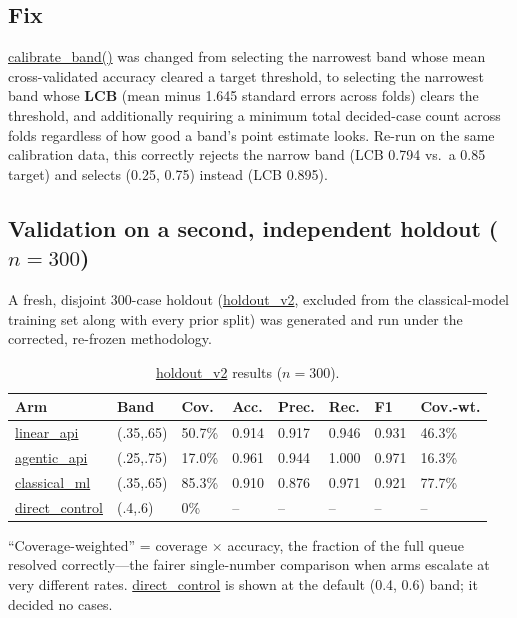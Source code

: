 \documentclass[]{ieeeaccess}
\newcommand{\code}[1]{\url{#1}}
\begin{document}
\subsection{Fix}\label{sec:fix}

\code{calibrate_band()} was changed from selecting the narrowest band
whose mean cross-validated accuracy cleared a target threshold, to
selecting the narrowest band whose \textbf{LCB} (mean minus 1.645
standard errors across folds) clears the threshold, and
additionally requiring a minimum total decided-case count across folds
regardless of how good a band's point estimate looks. Re-run on the same
calibration data, this correctly rejects the narrow band (LCB 0.794 vs.\
a 0.85 target) and selects (0.25, 0.75) instead (LCB 0.895).

\subsection{Validation on a second, independent holdout (\texorpdfstring{$n=300$}{n=300})}\label{sec:holdout2}

A fresh, disjoint 300-case holdout (\code{holdout_v2}, excluded from the
classical-model training set along with every prior split) was generated
and run under the corrected, re-frozen methodology.

\begin{table}[H]
\centering
\caption{\code{holdout_v2} results ($n=300$).}\label{tab:holdout2}
\scriptsize\setlength{\tabcolsep}{2pt}
\begin{tabularx}{\columnwidth}{@{}lYYYYYYY@{}}
\toprule
\textbf{Arm} & \textbf{Band} & \textbf{Cov.} & \textbf{Acc.} &
\textbf{Prec.} & \textbf{Rec.} & \textbf{F1} & \textbf{Cov.-wt.} \\
\midrule
\code{linear_api} & (.35,.65) & 50.7\% & 0.914 & 0.917 & 0.946 & 0.931 & 46.3\% \\
\code{agentic_api} & (.25,.75) & 17.0\% & 0.961 & 0.944 & 1.000 & 0.971 & 16.3\% \\
\code{classical_ml} & (.35,.65) & 85.3\% & 0.910 & 0.876 & 0.971 & 0.921 & 77.7\% \\
\code{direct_control} & (.4,.6) & 0\% & -- & -- & -- & -- & -- \\
\bottomrule
\end{tabularx}
\end{table}

``Coverage-weighted'' = coverage $\times$ accuracy, the fraction of the
full queue resolved correctly---the fairer single-number comparison
when arms escalate at very different rates. \code{direct_control} is
shown at the default (0.4, 0.6) band; it decided no cases.
\end{document}
